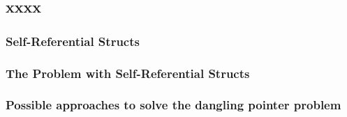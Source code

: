 \subsection{xxxx} %
\begin{frame}[fragile]
    \frametitle{Self-Referential Structs}
\end{frame}
% 
% 
% 
% 
% 
% 
% 
\begin{frame}[fragile]
    \frametitle{The Problem with Self-Referential Structs}
\end{frame}
% 
% 
% 
% 
% 
% 
\begin{frame}[fragile]
    \frametitle{Possible approaches to solve the dangling pointer problem}
\end{frame}
% 
% 
